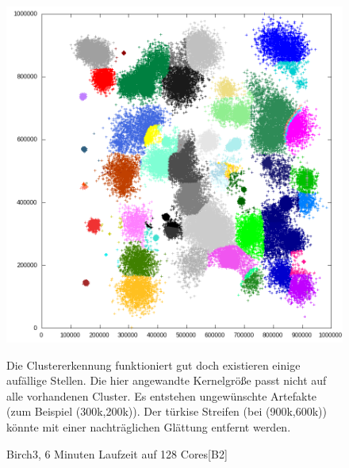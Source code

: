	\begin{figure}[H]
		\centering
		\includegraphics[scale=0.71]{../meanshift/output/pics/birch3_colored.png} 
		\vspace{-5pt}
		\caption{Birch3, 6 Minuten Laufzeit auf 128 Cores[B2]}
			Die Clustererkennung funktioniert gut doch existieren einige aufällige Stellen.
			Die hier angewandte Kernelgröße passt nicht auf alle vorhandenen Cluster. Es entstehen ungewünschte Artefakte (zum Beispiel (300k,200k)).
			Der türkise Streifen (bei (900k,600k)) könnte mit einer nachträglichen Glättung entfernt werden.
	\end{figure}
	\newpage
